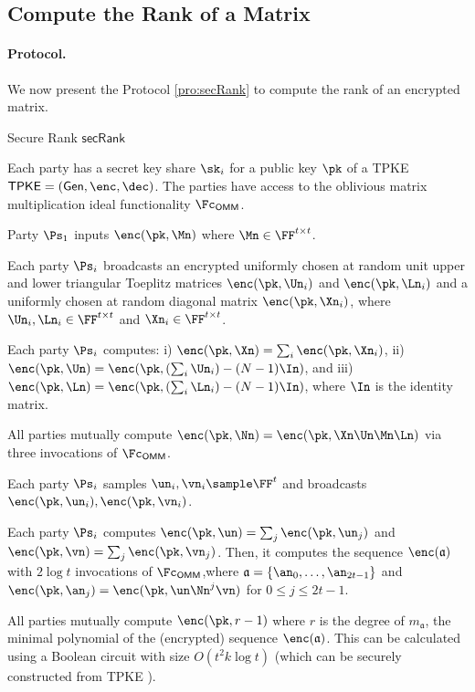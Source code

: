  
 
 \subsection{Compute the Rank of a Matrix}
 \label{sec:secRank}


\paragraph{Protocol.} We now present the Protocol \ref{pro:secRank} to compute the rank of an encrypted matrix.
  
  
 \begin{algorithm}
\caption{Secure Rank $\mathsf{secRank}$}
\label{pro:secRank}
\begin{algorithmic}[1]
\REQUIRE Each party has a secret key share $\sk_i$ for a public key $\pk$ of a TPKE $\mathsf{TPKE}=(\mathsf{Gen},\enc,\dec)$. The parties have access to the oblivious matrix multiplication ideal functionality $\Fc_\mathsf{OMM}$.

\ENSURE Party $\Ps_1$ inputs $\enc(\pk,\Mn)$ where $\Mn\in\FF^{t\times t}$.

\STATE Each party $\Ps_i$ broadcasts an encrypted uniformly chosen at random unit upper and lower triangular Toeplitz matrices $\enc(\pk,\Un_i)$ and $\enc(\pk,\Ln_i)$ and a uniformly chosen at random diagonal matrix $\enc(\pk,\Xn_i)$, where $\Un_i,\Ln_i\in\FF^{t\times t}$ and $\Xn_i\in\FF^{t\times t}$.

\STATE  Each party $\Ps_i$ computes: i) $\enc(\pk,\Xn)=\sum_i\enc(\pk,\Xn_i)$, ii) $\enc(\pk,\Un)=\enc(\pk,(\sum_i\Un_i)-(N-1)\In)$, and iii) $\enc(\pk,\Ln)=\enc(\pk,(\sum_i\Ln_i)- (N-1)\In)$, where $\In$ is the identity matrix.

\STATE All parties mutually compute $\enc(\pk,\Nn)=\enc(\pk,\Xn\Un\Mn\Ln)$ via three invocations of $\Fc_\mathsf{OMM}$.

\STATE Each party $\Ps_i$ samples $\un_i,\vn_i\sample \FF^t$ and broadcasts $\enc(\pk,\un_i),\enc(\pk,\vn_i)$.

\STATE Each party $\Ps_i$ computes $\enc(\pk,\un)=\sum_j\enc(\pk,\un_j)$ and $\enc(\pk,\vn)=\sum_j\enc(\pk,\vn_j)$. Then, it computes the sequence $\enc(\mathfrak{a})$ with $2\log t$ invocations of $\Fc_\mathsf{OMM}$,\footnotemark where $\mathfrak{a}=\{\an_0,\dots, \an_{2t-1}\}$ and $\enc(\pk,\an_j) = \enc(\pk,\un\Nn^j\vn)$ for $0\le j\le 2t-1$.

\STATE All parties mutually compute $\enc(\pk,r-1)$ where $r$ is the degree of $m_{\mathfrak{a}}$, the minimal polynomial of the (encrypted) sequence $\enc(\mathfrak{a})$. This can be calculated using a Boolean circuit with size $O(t^2k\log t)$ (which can be securely constructed from TPKE \cite{EC:SchTuy06}).
\end{algorithmic}
\end{algorithm}


